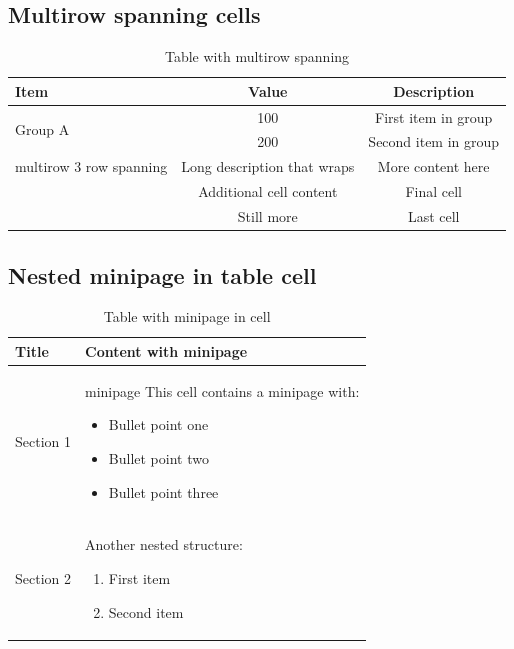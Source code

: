 \documentclass{article}
\begin{document}
\subsection{Multirow spanning cells}

\begin{table}[ht]
\centering
\caption{Table with multirow spanning}
\label{tab:multirow}
\begin{tabular}{|l|c|c|}
\hline
Item & Value & Description \\
\hline
\hline
\multirow{2}{*}{Group A} & 100 & First item in group \\
                         & 200 & Second item in group \\
\hline
\hline
multirow 3 row spanning &
Long description that wraps &
More content here \\
                         &
Additional cell content &
Final cell \\
                         &
Still more &
Last cell \\
\hline
\end{tabular}
\end{table}

\subsection{Nested minipage in table cell}

\begin{table}[ht]
\caption{Table with minipage in cell}
\label{tab:minipage}
\begin{tabular}{|p{3cm}|p{5cm}|}
\hline
Title & Content with minipage \\
\hline
Section 1 &
{minipage}{\hsize}
This cell contains a minipage with:
\begin{itemize}
  \item Bullet point one
  \item Bullet point two
  \item Bullet point three
\end{itemize}
\end{minipage}
\\
\hline
Section 2 &
\begin{minipage}{\hsize}
Another nested structure:
\begin{enumerate}
  \item First item
  \item Second item
\end{enumerate}
\end{minipage}
\\
\hline
\end{tabular}
\end{table}
\end{document}
